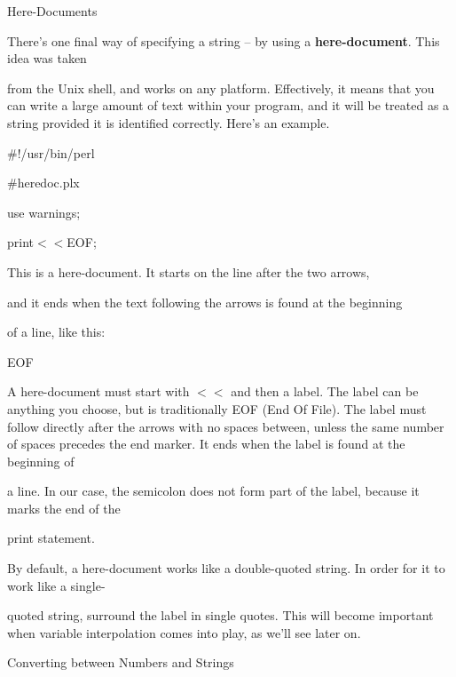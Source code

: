 \documentclass[a4paper,11pt]{book}
\begin{document}
\noindent 

\noindent Here-Documents

\noindent 

\noindent There's one final way of  specifying  a  string  --  by using  a  \textbf{here-document}.  This  idea  was  taken

\noindent from the Unix  shell,  and works  on  any  platform.  Effectively,  it  means  that  you  can  write  a  large amount of text within  your program,  and  it  will  be  treated  as  a  string  provided  it  is  identified correctly.  Here's an example.

\noindent 

\noindent \#!/usr/bin/perl

\noindent \#heredoc.plx

\noindent use warnings;

\noindent print$<$$<$EOF;

\noindent 

\noindent This is a here-document. It starts on the line after the two arrows,

\noindent and it ends when the text following the arrows is found at the beginning

\noindent of a line, like this:

\noindent 

\noindent EOF

\noindent 

\noindent A here-document must start with $<$$<$ and then a label. The label can be anything you choose, but is traditionally EOF (End Of File). The label must follow directly after the arrows with no spaces between, unless the same number of spaces precedes the end marker. It ends when the label is found at the beginning of

\noindent a line. In our case, the semicolon does not form part of the label, because it marks the end of the

\noindent print statement.

\noindent 

\noindent 

\noindent By default, a here-document works like a double-quoted string. In order for it to work like a single-

\noindent quoted string, surround the label in single quotes. This will become important when variable interpolation comes into play, as we'll see later on.

\noindent 

\noindent Converting between Numbers and Strings
\end{document}
